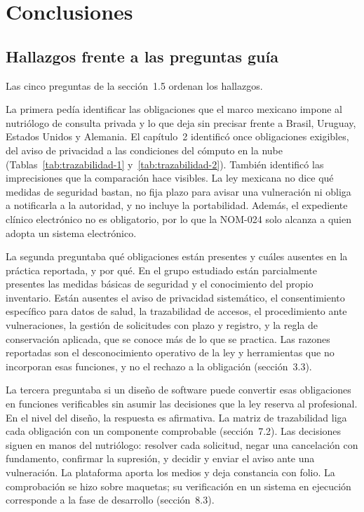 \documentclass[12pt, a4paper]{article}
\makeatletter
\newcommand{\saltoseccion}{\par
  \ifx\@deferlist\@empty
    \ifdim\pagegoal<\maxdimen
      \ifdim\dimexpr\textheight-\pagegoal+\pagetotal\relax>0.5\textheight\clearpage\fi
    \fi
  \else\clearpage\fi}
\let\seccionbase\section
\renewcommand{\section}{\saltoseccion\seccionbase}
\makeatother
\begin{document}
\section{Conclusiones}

\subsection{Hallazgos frente a las preguntas guía}
Las cinco preguntas de la sección~1.5 ordenan los hallazgos.

La primera pedía identificar las obligaciones que el marco mexicano
impone al nutriólogo de consulta privada y lo que deja sin precisar
frente a Brasil, Uruguay, Estados Unidos y Alemania. El capítulo~2
identificó once obligaciones exigibles, del aviso de privacidad a las
condiciones del cómputo en la nube (Tablas~\ref{tab:trazabilidad-1}
y~\ref{tab:trazabilidad-2}). También identificó las imprecisiones que la
comparación hace visibles. La ley mexicana no dice qué medidas de
seguridad bastan, no fija plazo para avisar una vulneración ni obliga a
notificarla a la autoridad, y no incluye la portabilidad. Además, el
expediente clínico electrónico no es obligatorio, por lo que la NOM-024
solo alcanza a quien adopta un sistema electrónico.

La segunda preguntaba qué obligaciones están presentes y cuáles ausentes
en la práctica reportada, y por qué. En el grupo estudiado están
parcialmente presentes las medidas básicas de seguridad y el
conocimiento del propio inventario. Están ausentes el aviso de
privacidad sistemático, el consentimiento específico para datos de
salud, la trazabilidad de accesos, el procedimiento ante vulneraciones,
la gestión de solicitudes con plazo y registro, y la regla de
conservación aplicada, que se conoce más de lo que se practica. Las
razones reportadas son el desconocimiento operativo de la ley y
herramientas que no incorporan esas funciones, y no el rechazo a la
obligación (sección~3.3).

La tercera preguntaba si un diseño de software puede convertir esas
obligaciones en funciones verificables sin asumir las decisiones que la
ley reserva al profesional. En el nivel del diseño, la respuesta es
afirmativa. La matriz de trazabilidad liga cada obligación con un
componente comprobable (sección~7.2). Las decisiones siguen en manos del
nutriólogo: resolver cada solicitud, negar una cancelación con
fundamento, confirmar la supresión, y decidir y enviar el aviso ante una
vulneración. La plataforma aporta los medios y deja constancia con
folio. La comprobación se hizo sobre maquetas; su verificación en un
sistema en ejecución corresponde a la fase de desarrollo (sección~8.3).
\end{document}
